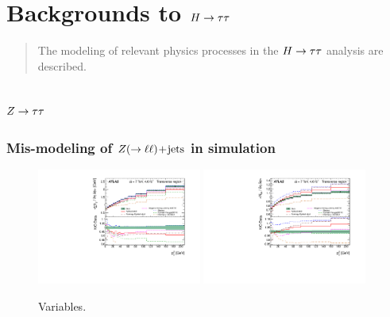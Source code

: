 \chapter[Backgrounds to $\Htautau$][Backgrounds to $\Htautau$]{Backgrounds to $\Htautau$}
\label{chap:backgrounds}

\begin{quote}
The modeling of relevant physics processes in the $\Htautau$ analysis are described.
\end{quote}

\section{$Z\rightarrow\tau\tau$}
\label{sec:backgrounds-ztautau}

\subsection{Mis-modeling of $Z (\rightarrow \ell\ell)\!+\!\text{jets}$ in simulation}

\begin{figure}[tp]
  \centering
  \includegraphics[width=0.48\textwidth]{figures/STDM-2011-42/fig_14b}
  \includegraphics[width=0.48\textwidth]{figures/STDM-2011-42/fig_17b}
  \caption{Variables.}
  \label{fig:backgrounds-zue}
\end{figure}

